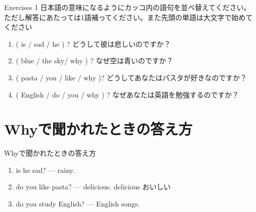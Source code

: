 \documentclass[aspectratio=169,xcolor={dvipsnames,table}]{beamer}
\begin{document}
\begin{frame}[plain]{Exercises 1}
日本語の意味になるようにカッコ内の語句を並べ替えてください。ただし解答にあたっては1語補ってください。また先頭の単語は大文字で始めてください
 \begin{enumerate}
  \item ( is / sad / he ) ? どうして彼は悲しいのですか？\\
  \item ( blue / the sky/ why ) ? なぜ空は青いのですか？\\
  \item ( pasta / you / like / why )? どうしてあなたはパスタが好きなのですか？\\
  \item ( English / do / you / why ) ? なぜあなたは英語を勉強するのですか？\\
 \end{enumerate}

\hfill{}
\end{frame}
\section{Whyで聞かれたときの答え方}
\begin{frame}[plain]{Whyで聞かれたときの答え方}
 \begin{enumerate}
  \item<1->  is he sad? ---   rainy.
  \item<4->  do you like pasta? ---   delicious.%
\hfill{\scriptsize delicious  おいしい}
  \item<7->  do you study English? ---   English songs.
 \end{enumerate}

\bigskip


\hfill{\scriptsize {}}
\end{frame}
\end{document}
